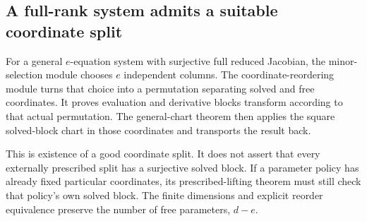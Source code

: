 \subsection{A full-rank system admits a suitable coordinate split}
For a general $e$-equation system with surjective full reduced Jacobian, the minor-selection module chooses $e$ independent columns. The coordinate-reordering module turns that choice into a permutation separating solved and free coordinates. It proves evaluation and derivative blocks transform according to that actual permutation. The general-chart theorem then applies the square solved-block chart in those coordinates and transports the result back.

This is existence of a good coordinate split. It does not assert that every externally prescribed split has a surjective solved block. If a parameter policy has already fixed particular coordinates, its prescribed-lifting theorem must still check that policy's own solved block. The finite dimensions and explicit reorder equivalence preserve the number of free parameters, $d-e$.
